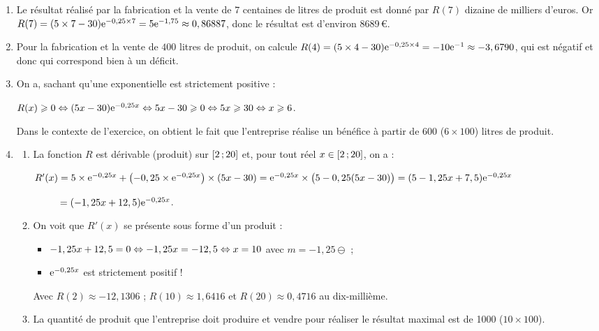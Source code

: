 \documentclass[a4paper,11pt]{article}
\begin{document}
\begin{enumerate}
	\item Le résultat réalisé par la fabrication et la vente de $7$ centaines de litres de produit est donné par $R(7)$ dizaine de milliers d'euros. Or $R(7)=(5 \times 7 - 30) {\rm e}^{-0,25 \times 7} = 5{\rm e}^{-1,75} \approx 0,86887$, donc le résultat est d'environ \num{8689}\,€. 
	\item Pour la fabrication et la vente de $400$ litres de produit, on calcule $R(4)=(5 \times 4 - 30) {\rm e}^{-0,25 \times 4} = -10{\rm e}^{-1} \approx -3,6790$, qui est négatif et donc qui correspond bien à un déficit.
	\item On a, sachant qu'une exponentielle est strictement positive :
	
	\hspace{0.5cm}$R(x) \geqslant 0 \Leftrightarrow (5x-30){\rm e}^{-0,25x} \Leftrightarrow 5x-30 \geqslant 0 \Leftrightarrow 5x \geqslant 30 \Leftrightarrow x \geqslant 6$.
	
	Dans le contexte de l'exercice, on obtient le fait que l'entreprise réalise un bénéfice à partir de 600 ($6 \times 100$) litres de produit. 
	\item 
	\begin{enumerate}
		\item La fonction $R$ est dérivable (produit) sur $\mbox{\ensuremath{\left[2\mathpunct{};20\right]}}$ et, pour tout réel $x \in \mbox{\ensuremath{\left[2\mathpunct{};20\right]}}$, on a :
		
		\hspace{0.5cm}$R'(x)=5 \times {\rm e}^{-0,25x} + \left(-0,25 \times {\rm e}^{-0,25x}\right) \times (5x-30) = {\rm e}^{-0,25x} \times \big( 5 -0,25(5x-30) \big) = (5-1,25x+7,5){\rm e}^{-0,25x}$
		
		\hspace{0.5cm}$\phantom{R'(x)} = (-1,25x+12,5){\rm e}^{-0,25x}$.
		\item On voit que $R'(x)$ se présente sous forme d'un produit :
		\begin{itemize}
			\item $-1,25x+12,5=0 \Leftrightarrow -1,25x=-12,5 \Leftrightarrow x= 10$ avec $m=-1,25 \ominus$ ;
			\item ${\rm e}^{-0,25x}$ est strictement positif !
		\end{itemize}
		\begin{center}
		\end{center}
		
		Avec $R(2) \approx -12,1306$ ; $R(10) \approx 1,6416$ et $R(20) \approx 0,4716$ au dix-millième.
		\item La quantité de produit que l'entreprise doit produire et vendre pour réaliser le résultat maximal est de \num{1000} ($10 \times 100$).
	\end{enumerate}
\end{enumerate}
\end{document}
